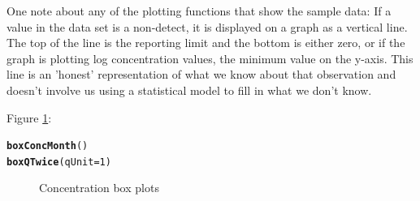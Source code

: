\documentclass[a4paper,11pt]{article}\usepackage{graphicx, color}
\makeatletter
\newcommand{\hlfunctioncall}[1]{\textcolor[rgb]{0.501960784313725,0,0.329411764705882}{\textbf{#1}}}%
\newenvironment{kframe}{%
 \def\at@end@of@kframe{}%
 \ifinner\ifhmode%
  \def\at@end@of@kframe{\end{minipage}}%
  \begin{minipage}{\columnwidth}%
 \fi\fi%
 \def\FrameCommand##1{\hskip\@totalleftmargin \hskip-\fboxsep
 \colorbox{shadecolor}{##1}\hskip-\fboxsep
     \hskip-\linewidth \hskip-\@totalleftmargin \hskip\columnwidth}%
 \MakeFramed {\advance\hsize-\width
   \@totalleftmargin\z@ \linewidth\hsize
   \@setminipage}}%
 {\par\unskip\endMakeFramed%
 \at@end@of@kframe}
\newenvironment{knitrout}{}{} %
\makeatother
\begin{document}
One note about any of the plotting functions that show the sample data:  If a value in the data set is a non-detect, it is displayed on a graph as a vertical line.  The top of the line is the reporting limit and the bottom is either zero, or if the graph is plotting log concentration values, the minimum value on the y-axis.  This line is an 'honest' representation of what we know about that observation and doesn't involve us using a statistical model to fill in what we don't know. 

Figure \ref{fig:plotBoxes}:
\begin{knitrout}
\color{fgcolor}\begin{kframe}
\begin{alltt}
\hlfunctioncall{boxConcMonth}()
\hlfunctioncall{boxQTwice}(qUnit=1)
\end{alltt}
\end{kframe}\begin{figure}[]
\caption[Concentration box plots]{Concentration box plots\label{fig:plotBoxes}}
\end{figure}


\end{knitrout}
\end{document}
